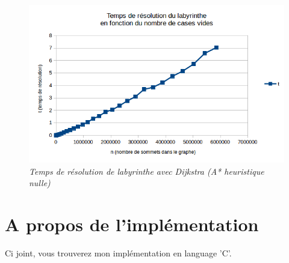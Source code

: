\documentclass[10pt]{article}
\begin{document}
		\begin{figure}
			\begin{center}
				\includegraphics[width=12cm,height=\textheight,keepaspectratio]{./images/courbe_temps.png}
			\end{center}
			\caption{\textit{Temps de résolution de labyrinthe avec Dijkstra (A* heuristique nulle)}}
		\end{figure}

	\newpage
	\section{A propos de l'implémentation}
		Ci joint, vous trouverez mon implémentation en language 'C'.
\end{document}
